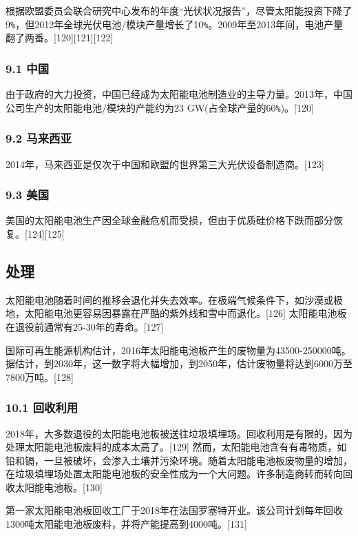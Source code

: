根据欧盟委员会联合研究中心发布的年度“光伏状况报告”，尽管太阳能投资下降了9\verb|%|，但2012年全球光伏电池/模块产量增长了10\verb|%|。2009年至2013年间，电池产量翻了两番。[120][121][122]

\subsubsection{9.1 中国}

由于政府的大力投资，中国已经成为太阳能电池制造业的主导力量。2013年，中国公司生产的太阳能电池/模块的产能约为23 GW(占全球产量的60\verb|%|)。[120]

\subsubsection{9.2 马来西亚}

2014年，马来西亚是仅次于中国和欧盟的世界第三大光伏设备制造商。[123]

\subsubsection{9.3 美国}

美国的太阳能电池生产因全球金融危机而受损，但由于优质硅价格下跌而部分恢复。[124][125]

\subsection{处理}

太阳能电池随着时间的推移会退化并失去效率。在极端气候条件下，如沙漠或极地，太阳能电池更容易因暴露在严酷的紫外线和雪中而退化。[126] 太阳能电池板在退役前通常有25-30年的寿命。[127]

国际可再生能源机构估计，2016年太阳能电池板产生的废物量为43500-250000吨。据估计，到2030年，这一数字将大幅增加，到2050年，估计废物量将达到6000万至7800万吨。[128]

\subsubsection{10.1 回收利用}

2018年，大多数退役的太阳能电池板被送往垃圾填埋场。回收利用是有限的，因为处理太阳能电池板废料的成本太高了。[129] 然而，太阳能电池含有有毒物质，如铅和镉，一旦被破坏，会渗入土壤并污染环境。随着太阳能电池板废物量的增加，在垃圾填埋场处置太阳能电池板的安全性成为一个大问题。许多制造商转而转向回收太阳能电池板。[130]

第一家太阳能电池板回收工厂于2018年在法国罗塞特开业。该公司计划每年回收1300吨太阳能电池板废料，并将产能提高到4000吨。[131]

